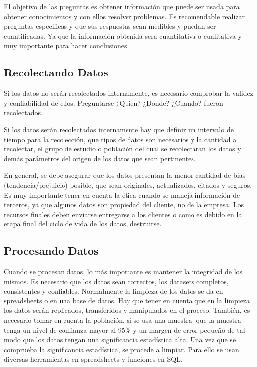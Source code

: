 \documentclass[12pt,a4paper,openright]{article}
\begin{document}
El objetivo de las preguntas es obtener informaci\'on que puede ser usada para obtener conocimientos y con ellos resolver problemas. Es recomendable realizar preguntas especificas y que sus respuestas sean medibles y puedan ser cuantificadas. Ya que la información obtenida sera cuantitativa o cualitativa y muy importante para hacer conclusiones.

\subsection{Recolectando Datos}
Si los datos no serán recolectados internamente, es necesario comprobar la validez y confiabilidad de ellos. Preguntarse ¿Quien? ¿Donde? ¿Cuando? fueron recolectados.

Si los datos serán recolectados internamente hay que definir un intervalo de tiempo para la recolección, que tipos de datos son necesarios y la cantidad a recolectar, el grupo de estudio o población del cual se recolectaran los datos y dem\'as parámetros del origen de los datos que sean pertinentes.

En general, se debe asegurar que los datos presentan la menor cantidad de bias (tendencia/prejuicio) posible, que sean originales, actualizados, citados y seguros. Es muy importante tener en cuenta la \'etica cuando se maneja informaci\'on de terceros, ya que algunos datos son propiedad del cliente, no de la empresa. Los recursos finales deben enviarse entregarse a los clientes o como es debido en la etapa final del ciclo de vida de los datos, destruirse.

\subsection{Procesando Datos}

Cuando se procesan datos, lo m\'as importante es mantener la integridad de los mismos. Es necesario que los datos sean correctos, los datasets completos, consistentes y confiables. Normalmente la limpieza de los datos se da en spreadsheets o en una base de datos. Hay que tener en cuenta que en la limpieza los datos serán replicados, transferidos y manipulados en el proceso. También, es necesario tomar en cuenta la población, si se usa una muestra, que la muestra tenga un nivel de confianza mayor al 95$\%$ y un margen de error pequeño de tal modo que los datos tengan una significancia estadística alta. Una vez que se comprueba la significancia estadística, se procede a limpiar. Para ello se usan diversas herramientas en spreadsheets y funciones en SQL.
\end{document}
